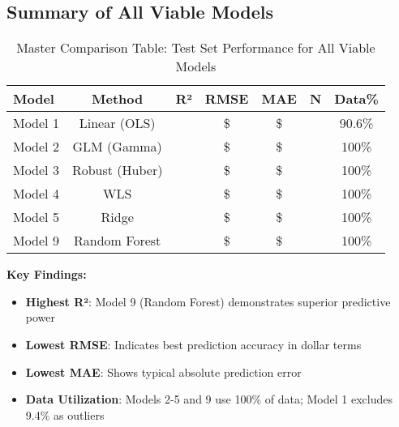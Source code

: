\subsection{Summary of All Viable Models}

\begin{table}[h!]
\centering
\caption{Master Comparison Table: Test Set Performance for All Viable Models}
\label{tab:master_comparison}
\begin{tabular}{lcccccc}
\toprule
\textbf{Model} & \textbf{Method} & \textbf{R²} & \textbf{RMSE} & \textbf{MAE} & \textbf{N} & \textbf{Data\%} \\
\midrule
Model 1 & Linear (OLS) & \ModelOneRSquaredTest{} & \$\ModelOneRMSETest{} & \$\ModelOneMAETest{} & \ModelOneTestSamples{} & 90.6\% \\
Model 2 & GLM (Gamma) & \ModelTwoRSquaredTest{} & \$\ModelTwoRMSETest{} & \$\ModelTwoMAETest{} & \ModelTwoTestSamples{} & 100\% \\
Model 3 & Robust (Huber) & \ModelThreeRSquaredTest{} & \$\ModelThreeRMSETest{} & \$\ModelThreeMAETest{} & \ModelThreeTestSamples{} & 100\% \\
Model 4 & WLS & \ModelFourRSquaredTest{} & \$\ModelFourRMSETest{} & \$\ModelFourMAETest{} & \ModelFourTestSamples{} & 100\% \\
Model 5 & Ridge & \ModelFiveRSquaredTest{} & \$\ModelFiveRMSETest{} & \$\ModelFiveMAETest{} & \ModelFiveTestSamples{} & 100\% \\
Model 9 & Random Forest & \ModelNineRSquaredTest{} & \$\ModelNineRMSETest{} & \$\ModelNineMAETest{} & \ModelNineTestSamples{} & 100\% \\
\bottomrule
\end{tabular}
\end{table}

\textbf{Key Findings:}
\begin{itemize}
    \item \textbf{Highest R²}: Model 9 (Random Forest) demonstrates superior predictive power
    \item \textbf{Lowest RMSE}: Indicates best prediction accuracy in dollar terms
    \item \textbf{Lowest MAE}: Shows typical absolute prediction error
    \item \textbf{Data Utilization}: Models 2-5 and 9 use 100\% of data; Model 1 excludes 9.4\% as outliers
\end{itemize}


